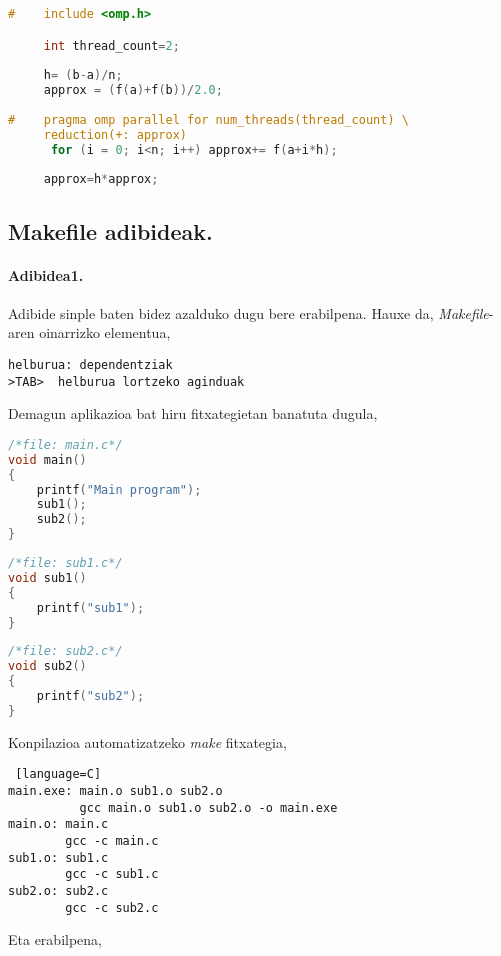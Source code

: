 \begin{lstlisting}[language=C]
#    include <omp.h>

     int thread_count=2;
     
     h= (b-a)/n;
     approx = (f(a)+f(b))/2.0;
     
#    pragma omp parallel for num_threads(thread_count) \
     reduction(+: approx)
      for (i = 0; i<n; i++) approx+= f(a+i*h);
      
     approx=h*approx;
\end{lstlisting}

\subsection*{Makefile adibideak.}

 
\paragraph*{Adibidea1.}
Adibide sinple baten bidez azalduko dugu bere erabilpena. Hauxe da, \emph{Makefile}-aren oinarrizko elementua,
\begin{lstlisting}
helburua: dependentziak
>TAB>  helburua lortzeko aginduak
\end{lstlisting}

Demagun aplikazioa bat hiru fitxategietan banatuta dugula,
\begin{lstlisting}[language=C]
/*file: main.c*/
void main()
{
    printf("Main program");
    sub1();
    sub2();
}
\end{lstlisting}

\begin{lstlisting}[language=C]
/*file: sub1.c*/
void sub1()
{
    printf("sub1");
}
\end{lstlisting}

\begin{lstlisting}[language=C]
/*file: sub2.c*/
void sub2()
{
    printf("sub2");
}
\end{lstlisting}

Konpilazioa automatizatzeko \emph{make} fitxategia,

\begin{lstlisting} [language=C]
main.exe: main.o sub1.o sub2.o
	      gcc main.o sub1.o sub2.o -o main.exe
main.o: main.c
        gcc -c main.c
sub1.o: sub1.c
        gcc -c sub1.c        
sub2.o: sub2.c
        gcc -c sub2.c        
\end{lstlisting}

Eta erabilpena,

